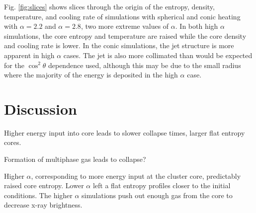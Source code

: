 \documentclass[iop,apjl, twocolappendix]{emulateapj}   %
\begin{document}
Fig. \ref{fig:slices} shows slices through the origin of the entropy, density,
temperature, and cooling rate of simulations with spherical and conic heating
with $\alpha=2.2$ and $\alpha=2.8$, two more extreme values of $\alpha$. In
both high $\alpha$ simulations, the core entropy and temperature are raised
while the core density and cooling rate is lower. In the conic simulations, the
jet structure is more apparent in high $\alpha$ cases. The jet is also more
collimated than would be expected for the $\cos^2 \theta$ dependence used,
although this may be due to the small radius where the majority of the energy
is deposited in the high $\alpha$ case.

\section{Discussion}
\label{sec:discussion}

\textbullet Higher energy input into core leads to slower collapse times, larger flat entropy cores.

\textbullet Formation of multiphase gas leads to collapse?

Higher $\alpha$, corresponding to more energy input at the cluster core,
predictably raised core entropy. Lower $\alpha$ left a flat entropy
profiles closer to the initial conditions.  The higher $\alpha$
simulations push out enough gas from the core to decrease x-ray
brightness. 

\end{document}
